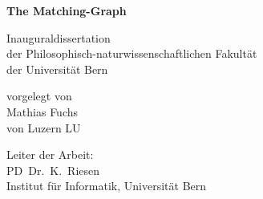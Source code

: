\thispagestyle{empty}


  \large

  \vfill

  \begin{center}
    \Large
{\bf The Matching-Graph} \\
\vspace*{2cm}
    \large

    Inauguraldissertation                              \\
    der Philosophisch-naturwissenschaftlichen Fakult\"at \\
    der Universit\"at Bern
  \end{center}

  \vspace{0.75cm}

  \begin{center}
    vorgelegt von                \\ \vspace*{0.75cm} 
       {Mathias Fuchs} \\ \vspace*{0.75cm} 
  von Luzern LU
  \end{center}

  \vfill\vfill

  \begin{center}
Leiter der Arbeit:\\[7pt]
PD~Dr.~K.~Riesen\\
Institut f\"ur Informatik, Universit\"at Bern

  \end{center}

  \vfill

